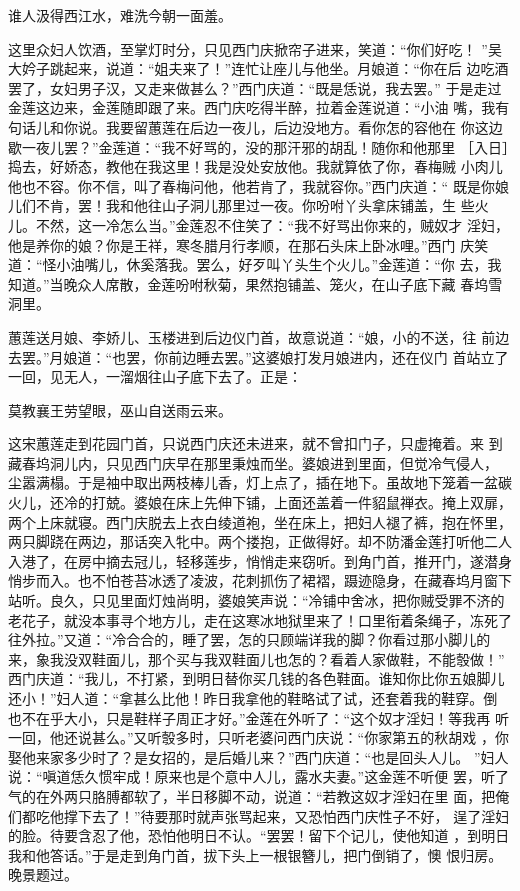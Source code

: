 谁人汲得西江水，难洗今朝一面羞。

这里众妇人饮酒，至掌灯时分，只见西门庆掀帘子进来，笑道：“你们好吃！
”吴大妗子跳起来，说道：“姐夫来了！”连忙让座儿与他坐。月娘道：“你在后
边吃酒罢了，女妇男子汉，又走来做甚么？”西门庆道：“既是恁说，我去罢。”
于是走过金莲这边来，金莲随即跟了来。西门庆吃得半醉，拉着金莲说道：“小油
嘴，我有句话儿和你说。我要留蕙莲在后边一夜儿，后边没地方。看你怎的容他在
你这边歇一夜儿罢？”金莲道：“我不好骂的，没的那汗邪的胡乱！随你和他那里
［入日］捣去，好娇态，教他在我这里！我是没处安放他。我就算依了你，春梅贼
小肉儿他也不容。你不信，叫了春梅问他，他若肯了，我就容你。”西门庆道：“
既是你娘儿们不肯，罢！我和他往山子洞儿那里过一夜。你吩咐丫头拿床铺盖，生
些火儿。不然，这一冷怎么当。”金莲忍不住笑了：“我不好骂出你来的，贼奴才
淫妇，他是养你的娘？你是王祥，寒冬腊月行孝顺，在那石头床上卧冰哩。”西门
庆笑道：“怪小油嘴儿，休奚落我。罢么，好歹叫丫头生个火儿。”金莲道：“你
去，我知道。”当晚众人席散，金莲吩咐秋菊，果然抱铺盖、笼火，在山子底下藏
春坞雪洞里。

蕙莲送月娘、李娇儿、玉楼进到后边仪门首，故意说道：“娘，小的不送，往
前边去罢。”月娘道：“也罢，你前边睡去罢。”这婆娘打发月娘进内，还在仪门
首站立了一回，见无人，一溜烟往山子底下去了。正是：

莫教襄王劳望眼，巫山自送雨云来。

这宋蕙莲走到花园门首，只说西门庆还未进来，就不曾扣门子，只虚掩着。来
到藏春坞洞儿内，只见西门庆早在那里秉烛而坐。婆娘进到里面，但觉冷气侵人，
尘嚣满榻。于是袖中取出两枝棒儿香，灯上点了，插在地下。虽故地下笼着一盆碳
火儿，还冷的打兢。婆娘在床上先伸下铺，上面还盖着一件貂鼠禅衣。掩上双扉，
两个上床就寝。西门庆脱去上衣白绫道袍，坐在床上，把妇人褪了裤，抱在怀里，
两只脚跷在两边，那话突入牝中。两个搂抱，正做得好。却不防潘金莲打听他二人
入港了，在房中摘去冠儿，轻移莲步，悄悄走来窃听。到角门首，推开门，遂潜身
悄步而入。也不怕苍苔冰透了凌波，花刺抓伤了裙褶，蹑迹隐身，在藏春坞月窗下
站听。良久，只见里面灯烛尚明，婆娘笑声说：“冷铺中舍冰，把你贼受罪不济的
老花子，就没本事寻个地方儿，走在这寒冰地狱里来了！口里衔着条绳子，冻死了
往外拉。”又道：“冷合合的，睡了罢，怎的只顾端详我的脚？你看过那小脚儿的
来，象我没双鞋面儿，那个买与我双鞋面儿也怎的？看着人家做鞋，不能彀做！”
西门庆道：“我儿，不打紧，到明日替你买几钱的各色鞋面。谁知你比你五娘脚儿
还小！”妇人道：“拿甚么比他！昨日我拿他的鞋略试了试，还套着我的鞋穿。倒
也不在乎大小，只是鞋样子周正才好。”金莲在外听了：“这个奴才淫妇！等我再
听一回，他还说甚么。”又听彀多时，只听老婆问西门庆说：“你家第五的秋胡戏
，你娶他来家多少时了？是女招的，是后婚儿来？”西门庆道：“也是回头人儿。
”妇人说：“嗔道恁久惯牢成！原来也是个意中人儿，露水夫妻。”这金莲不听便
罢，听了气的在外两只胳膊都软了，半日移脚不动，说道：“若教这奴才淫妇在里
面，把俺们都吃他撑下去了！”待要那时就声张骂起来，又恐怕西门庆性子不好，
逞了淫妇的脸。待要含忍了他，恐怕他明日不认。“罢罢！留下个记儿，使他知道
，到明日我和他答话。”于是走到角门首，拔下头上一根银簪儿，把门倒销了，懊
恨归房。晚景题过。

